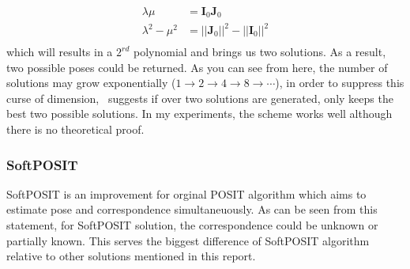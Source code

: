 \documentclass[a4paper]{article}
\begin{document}
\begin{align*}
\lambda \mu &= \mathbf{I}_0\mathbf{J}_0 \\
\lambda^2 -\mu^2 &= ||\mathbf{J}_0||^2-||\mathbf{I}_0||^2 \\
\end{align*}
which will results in a $2^{rd}$ polynomial and brings us two solutions. As a result, two possible poses could be returned. As you can see from here, the number of solutions may grow exponentially ($1 \to 2 \to 4 \to 8 \to \cdots$), in order to suppress this curse of dimension,~\cite{oberkampf1996iterative} suggests if over two solutions are generated, only keeps the best two possible solutions. In my experiments, the scheme works well although there is no theoretical proof.
\subsubsection{SoftPOSIT}
SoftPOSIT is an improvement for orginal POSIT algorithm which aims to estimate pose and correspondence simultaneuously. As can be seen from this statement, for SoftPOSIT solution, the correspondence could be unknown or partially known. This serves the biggest difference of SoftPOSIT algorithm relative to other solutions mentioned in this report.
\end{document}
